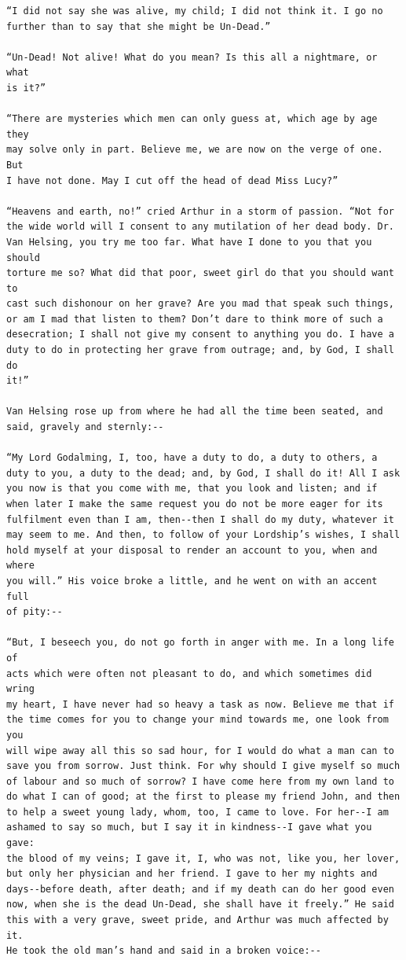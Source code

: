 \documentclass{article}
\begin{document}
\begin{verbatim}
“I did not say she was alive, my child; I did not think it. I go no
further than to say that she might be Un-Dead.”

“Un-Dead! Not alive! What do you mean? Is this all a nightmare, or what
is it?”

“There are mysteries which men can only guess at, which age by age they
may solve only in part. Believe me, we are now on the verge of one. But
I have not done. May I cut off the head of dead Miss Lucy?”

“Heavens and earth, no!” cried Arthur in a storm of passion. “Not for
the wide world will I consent to any mutilation of her dead body. Dr.
Van Helsing, you try me too far. What have I done to you that you should
torture me so? What did that poor, sweet girl do that you should want to
cast such dishonour on her grave? Are you mad that speak such things,
or am I mad that listen to them? Don’t dare to think more of such a
desecration; I shall not give my consent to anything you do. I have a
duty to do in protecting her grave from outrage; and, by God, I shall do
it!”

Van Helsing rose up from where he had all the time been seated, and
said, gravely and sternly:--

“My Lord Godalming, I, too, have a duty to do, a duty to others, a
duty to you, a duty to the dead; and, by God, I shall do it! All I ask
you now is that you come with me, that you look and listen; and if
when later I make the same request you do not be more eager for its
fulfilment even than I am, then--then I shall do my duty, whatever it
may seem to me. And then, to follow of your Lordship’s wishes, I shall
hold myself at your disposal to render an account to you, when and where
you will.” His voice broke a little, and he went on with an accent full
of pity:--

“But, I beseech you, do not go forth in anger with me. In a long life of
acts which were often not pleasant to do, and which sometimes did wring
my heart, I have never had so heavy a task as now. Believe me that if
the time comes for you to change your mind towards me, one look from you
will wipe away all this so sad hour, for I would do what a man can to
save you from sorrow. Just think. For why should I give myself so much
of labour and so much of sorrow? I have come here from my own land to
do what I can of good; at the first to please my friend John, and then
to help a sweet young lady, whom, too, I came to love. For her--I am
ashamed to say so much, but I say it in kindness--I gave what you gave:
the blood of my veins; I gave it, I, who was not, like you, her lover,
but only her physician and her friend. I gave to her my nights and
days--before death, after death; and if my death can do her good even
now, when she is the dead Un-Dead, she shall have it freely.” He said
this with a very grave, sweet pride, and Arthur was much affected by it.
He took the old man’s hand and said in a broken voice:--


\end{verbatim}
\end{document}
